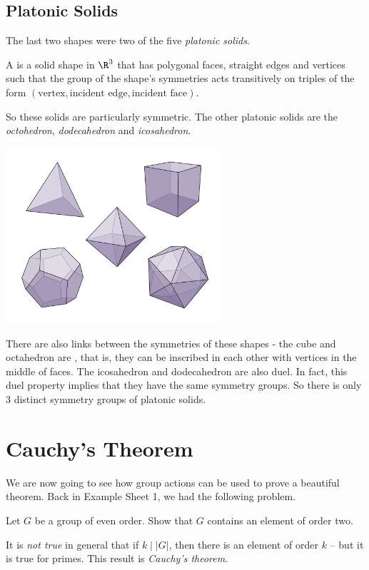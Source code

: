 \documentclass[a4]{scrreprt}
\newcommand{\newsection}{\section}
\newcommand{\newsubsection}{\subsection}
\begin{document}
\newsubsection{Platonic Solids}

The last two shapes were two of the five \emph{platonic solids}.

\begin{definition}
	A  is a solid shape in $\R^3$ that has polygonal faces, straight edges and vertices such that the group of the shape's symmetries acts transitively on triples of the form $(\text{vertex}, \text{incident edge}, \text{incident face})$.
\end{definition}
So these solids are particularly symmetric. The other platonic solids are the \emph{octohedron}, \emph{dodecahedron} and \emph{icosahedron}.
\begin{center}
	\includegraphics[width=0.6\textwidth]{platonic.png}
\end{center}

There are also links between the symmetries of these shapes - the cube and octahedron are , that is, they can be inscribed in each other with vertices in the middle of faces. The icosahedron and dodecahedron are also duel. In fact, this duel property implies that they have the same symmetry groups. So there is only 3 distinct symmetry groups of platonic solids.

\newsection{Cauchy's Theorem}

We are now going to see how group actions can be used to prove a beautiful theorem. Back in Example Sheet 1, we had the following problem.

\begin{problem*}
	Let $G$ be a group of even order. Show that $G$ contains an element of order two.
\end{problem*}

It is \emph{not true} in general that if $k \mid |G|$, then there is an element of order $k$ -- but it is true for primes. This result is \emph{Cauchy's theorem}.
\end{document}
